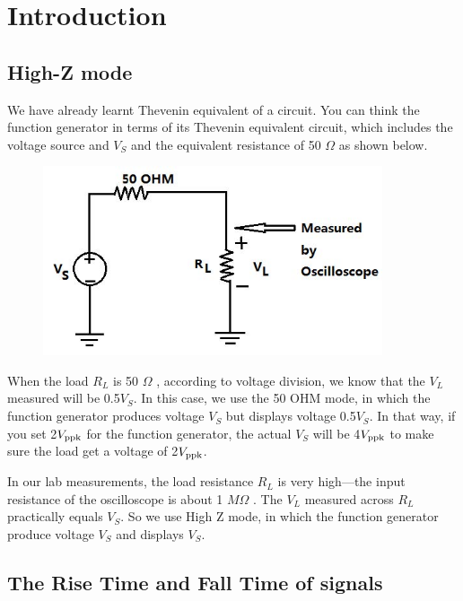 \documentclass[a4paper]{report}
\begin{document}
\section{Introduction}
\subsection{High-Z mode}
We have already learnt Thevenin equivalent of a circuit. You can think the function generator in terms of its Thevenin equivalent circuit, which includes the voltage source and $V_S$ and the equivalent resistance of 50 $\Omega$ as shown below.
\begin{figure}[H]
	\centering
	\includegraphics[width=10cm]{1.jpg}
\end{figure}
When the load $R_L$ is 50 $\Omega$ , according to voltage division, we know that the $V_L$ measured will be 0.5$V_S$. In this case, we use the 50 OHM mode, in which the function generator produces voltage $V_S$ but displays voltage 0.5$V_S$. In that way, if you set 2$V_{\rm{ppk}}$ for the function generator, the actual $V_S$ will be 4$V_{\rm{ppk}}$ to make sure the load get a voltage of 2$V_{\rm{ppk}}$.

In our lab measurements, the load resistance $R_L$ is very high—the input resistance of the oscilloscope is about 1 $M\Omega$ . The $V_L$ measured across $R_L$ practically equals $V_S$. So we use High Z mode, in which the function generator produce voltage $V_S$ and displays $V_S$.
\subsection{The Rise Time and Fall Time of signals}
\end{document}
